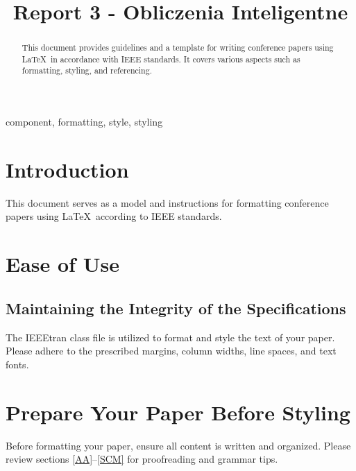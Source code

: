 \documentclass[conference]{IEEEtran}
\begin{document}
\title{Report 3 - Obliczenia Inteligentne}
\author{
    \and
}


\maketitle

\begin{abstract}
This document provides guidelines and a template for writing conference papers using \LaTeX\ in accordance with IEEE standards. It covers various aspects such as formatting, styling, and referencing.
\end{abstract}

\begin{IEEEkeywords}
component, formatting, style, styling
\end{IEEEkeywords}

\section{Introduction}
This document serves as a model and instructions for formatting conference papers using \LaTeX\ according to IEEE standards.

\section{Ease of Use}

\subsection{Maintaining the Integrity of the Specifications}
The IEEEtran class file is utilized to format and style the text of your paper. Please adhere to the prescribed margins, column widths, line spaces, and text fonts.

\section{Prepare Your Paper Before Styling}
Before formatting your paper, ensure all content is written and organized. Please review sections \ref{AA}--\ref{SCM} for proofreading and grammar tips.
\end{document}
